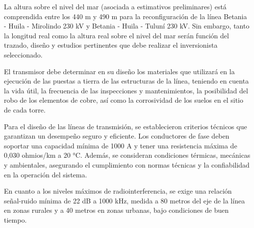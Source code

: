 La altura sobre el nivel del mar (asociada a estimativos preliminares) está comprendida entre los 440 m y 490 m para la reconfiguración de la línea Betania - Huila - Mirolindo 230 kV y Betania - Huila - Tuluní 230 kV. Sin embargo, tanto la longitud real como la altura real sobre el nivel del mar serán función del trazado, diseño y estudios pertinentes que debe realizar el inversionista seleccionado.

El transmisor debe determinar en su diseño los materiales que utilizará en la ejecución de las puestas a tierra de las estructuras de la línea, teniendo en cuenta la vida útil, la frecuencia de las inspecciones y mantenimientos, la posibilidad del robo de los elementos de cobre, así como la corrosividad de los suelos en el sitio de cada torre.

Para el diseño de las líneas de transmisión, se establecieron criterios técnicos que garantizan un desempeño seguro y eficiente. Los conductores de fase deben soportar una capacidad mínima de 1000 A y tener una resistencia máxima de 0,030 ohmios/km a 20 °C. Además, se consideran condiciones térmicas, mecánicas y ambientales, asegurando el cumplimiento con normas técnicas y la confiabilidad en la operación del sistema.

En cuanto a los niveles máximos de radiointerferencia, se exige una relación señal-ruido mínima de 22 dB a 1000 kHz, medida a 80 metros del eje de la línea en zonas rurales y a 40 metros en zonas urbanas, bajo condiciones de buen tiempo.
